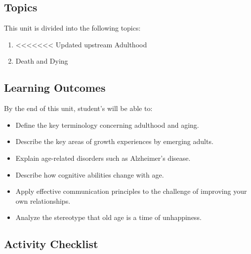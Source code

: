 \documentclass[
]{book}
\providecommand{\tightlist}{%
  \setlength{\itemsep}{0pt}\setlength{\parskip}{0pt}}
\begin{document}
\hypertarget{topics-3}{%
\subsection*{Topics}\label{topics-3}}

This unit is divided into the following topics:

\begin{enumerate}
\def\labelenumi{\arabic{enumi}.}
\tightlist
\item
<<<<<<< Updated upstream
  Adulthood\\
\item
  Death and Dying
\end{enumerate}

\hypertarget{learning-outcomes-3}{%
\subsection*{Learning Outcomes}\label{learning-outcomes-3}}

By the end of this unit, student's will be able to:

\begin{itemize}
\tightlist
\item
  Define the key terminology concerning adulthood and aging.\\
\item
  Describe the key areas of growth experiences by emerging adults.\\
\item
  Explain age-related disorders such as Alzheimer's disease.\\
\item
  Describe how cognitive abilities change with age.\\
\item
  Apply effective communication principles to the challenge of improving your own relationships.\\
\item
  Analyze the stereotype that old age is a time of unhappiness.
\end{itemize}

\hypertarget{activity-checklist-3}{%
\subsection*{Activity Checklist}\label{activity-checklist-3}}
\end{document}
